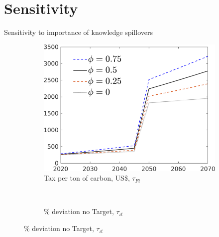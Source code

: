 \documentclass[11pt,aspectratio=169]{beamer}
\begin{document}
\section*{Sensitivity}

\begin{frame}{Sensitivity to importance of knowledge spillovers}
	\hypertarget{sensphi}{}
	\vspace{-3mm}
	\begin{figure}[h!!]
		
		\begin{subfigure}{0.45\textwidth}		
			\caption{Tax per ton of carbon,  US\$, $\tau_{Ft}$}
			\includegraphics[width=1\textwidth]{../codding_model/own_basedOnFried/optimalPol_010922_revision/figures/all_13Sept22/Phi_SensN_Tauf_spillover0_knspil0_xgr0_nsk0_sep0_extern0_PV1_etaa0.79_lgd1.png}
		\end{subfigure}	
		\begin{minipage}[]{0.05\textwidth}
			\ 
		\end{minipage}
		\begin{subfigure}{0.45\textwidth}		
			\caption{ \% deviation no Target, $\tau_{\iota t}$}

\end{subfigure}
\end{figure}
\end{frame}
\end{document}
